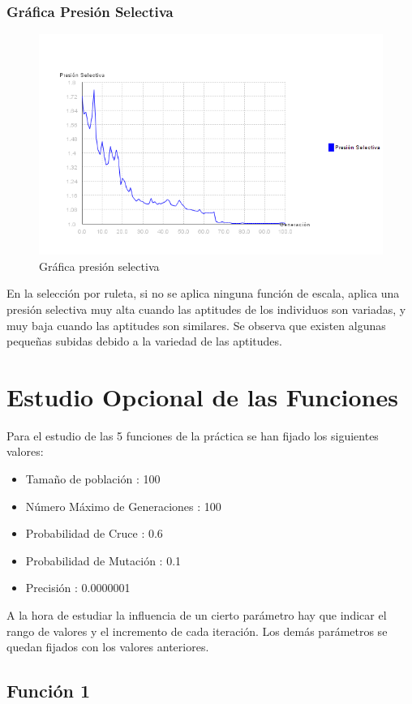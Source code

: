 \documentclass[12pt]{article}
\begin{document}
\subsubsection*{Gráfica Presión Selectiva}
\begin{figure}[H]
\centering
\includegraphics[scale=0.4]{graficas/F5inicial_presion}
\caption{Gráfica presión selectiva}
\label{fig}
\end{figure}
	En la selección por ruleta, si no se aplica ninguna función de escala, aplica una presión selectiva muy alta cuando las aptitudes de los individuos son variadas, y muy baja cuando las aptitudes son similares. Se observa que existen algunas pequeñas subidas debido a la variedad de las aptitudes.	
\newpage

\section{Estudio Opcional de las Funciones}	
	Para el estudio de las 5 funciones de la práctica se han fijado los siguientes valores:
	\begin{itemize}
		\item Tamaño de población : 100
		\item Número Máximo de Generaciones : 100
		\item Probabilidad de Cruce : 0.6
		\item Probabilidad de Mutación : 0.1
		\item Precisión : 0.0000001
	\end{itemize}
	A la hora de estudiar la influencia de un cierto parámetro hay que indicar el rango de valores y el incremento de cada iteración. Los demás parámetros se quedan fijados con los valores anteriores.
\subsection{Función 1}
\end{document}
